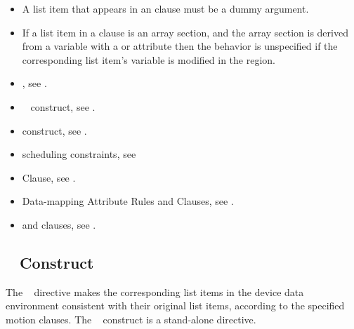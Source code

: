 \begin{itemize}
\fortranspecificstart
\item A list item that appears in an  clause must be a dummy
  argument.
\item If a list item in a  clause is an array section, and the array section is derived from a variable with a  or  attribute then the behavior is unspecified if the corresponding list item's variable is modified in the region.
\fortranspecificend
\end{itemize}

\crossreferences
\begin{itemize}
\item {}, see 
. 

\item {}~ construct, see 
.

\item {} construct, see 
.

\item {} scheduling constraints, see 

\item {} Clause, see .

\item Data-mapping Attribute Rules and Clauses, see 
.

\item {} and  clauses, see 
.
\end{itemize}









\subsection{~ Construct}
\label{subsec:target update Construct}
\summary
The ~ directive makes the corresponding list items in the device data 
environment consistent with their original list items, according to the specified motion 
clauses. The ~ construct is a stand-alone directive.

